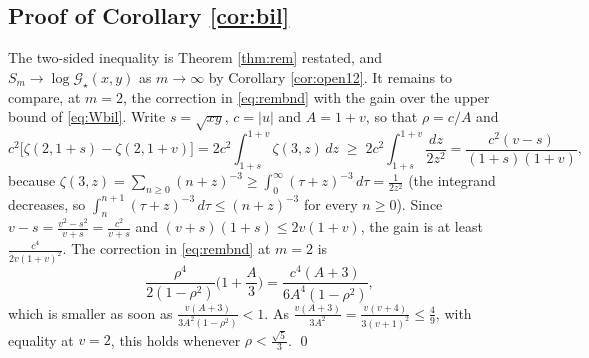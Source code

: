 \documentclass[11pt,a4paper]{amsart}
\theoremstyle{definition}
\newcommand{\Gs}{\mathcal{G}_{\star}}
\begin{document}
\subsection{Proof of Corollary \ref{cor:bil}}
The two-sided inequality is Theorem \ref{thm:rem} restated, and
$S_{m}\to\log\Gs(x,y)$ as $m\to\infty$ by Corollary \ref{cor:open12}. It remains to
compare, at $m=2$, the correction in \eqref{eq:rembnd} with the gain over the upper
bound of \eqref{eq:Wbil}. Write $s=\sqrt{xy}$, $c=|u|$ and $A=1+v$, so that
$\rho=c/A$ and
\[
  c^{2}\big[\zeta(2,1+s)-\zeta(2,1+v)\big]
  =2c^{2}\int_{1+s}^{1+v}\zeta(3,z)\,dz
  \;\ge\;2c^{2}\int_{1+s}^{1+v}\frac{dz}{2z^{2}}
  =\frac{c^{2}(v-s)}{(1+s)(1+v)},
\]
because $\zeta(3,z)=\sum_{n\ge0}(n+z)^{-3}\ge\int_{0}^{\infty}(\tau+z)^{-3}\,d\tau=\frac{1}{2z^{2}}$
(the integrand decreases, so $\int_{n}^{n+1}(\tau+z)^{-3}\,d\tau\le(n+z)^{-3}$ for every $n\ge0$).
Since $v-s=\frac{v^{2}-s^{2}}{v+s}=\frac{c^{2}}{v+s}$ and $(v+s)(1+s)\le2v(1+v)$, the gain
is at least $\frac{c^{4}}{2v(1+v)^{2}}$. The correction in \eqref{eq:rembnd} at $m=2$ is
\[
  \frac{\rho^{4}}{2(1-\rho^{2})}\Big(1+\frac{A}{3}\Big)
  =\frac{c^{4}(A+3)}{6A^{4}(1-\rho^{2})},
\]
which is smaller as soon as $\frac{v(A+3)}{3A^{2}(1-\rho^{2})}<1$. As
$\frac{v(A+3)}{3A^{2}}=\frac{v(v+4)}{3(v+1)^{2}}\le\frac49$, with equality at $v=2$, this
holds whenever $\rho<\frac{\sqrt5}{3}$. \qed
\end{document}
